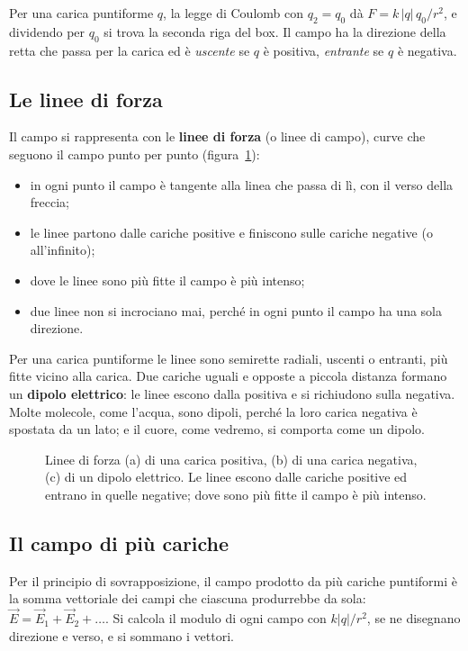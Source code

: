 Per una carica puntiforme $q$, la legge di Coulomb con $q_2 = q_0$ dà $F = k\,|q|\,q_0/r^{2}$, e dividendo per $q_0$ si trova la seconda riga del box. Il campo ha la direzione della retta che passa per la carica ed è \emph{uscente} se $q$ è positiva, \emph{entrante} se $q$ è negativa.

\subsection{Le linee di forza}

Il campo si rappresenta con le \textbf{linee di forza} (o linee di campo), curve che seguono il campo punto per punto (figura~\ref{fig:ud6-linee}):
\begin{itemize}
  \item in ogni punto il campo è tangente alla linea che passa di lì, con il verso della freccia;
  \item le linee partono dalle cariche positive e finiscono sulle cariche negative (o all'infinito);
  \item dove le linee sono più fitte il campo è più intenso;
  \item due linee non si incrociano mai, perché in ogni punto il campo ha una sola direzione.
\end{itemize}
Per una carica puntiforme le linee sono semirette radiali, uscenti o entranti, più fitte vicino alla carica. Due cariche uguali e opposte a piccola distanza formano un \textbf{dipolo elettrico}: le linee escono dalla positiva e si richiudono sulla negativa. Molte molecole, come l'acqua, sono dipoli, perché la loro carica negativa è spostata da un lato; e il cuore, come vedremo, si comporta come un dipolo.

\begin{figure}[h]
\centering

\caption{Linee di forza (a) di una carica positiva, (b) di una carica negativa, (c) di un dipolo elettrico. Le linee escono dalle cariche positive ed entrano in quelle negative; dove sono più fitte il campo è più intenso.}
\label{fig:ud6-linee}
\end{figure}

\subsection{Il campo di più cariche}

Per il principio di sovrapposizione, il campo prodotto da più cariche puntiformi è la somma vettoriale dei campi che ciascuna produrrebbe da sola: $\vec E = \vec E_1 + \vec E_2 + \dots$. Si calcola il modulo di ogni campo con $k|q|/r^{2}$, se ne disegnano direzione e verso, e si sommano i vettori.

